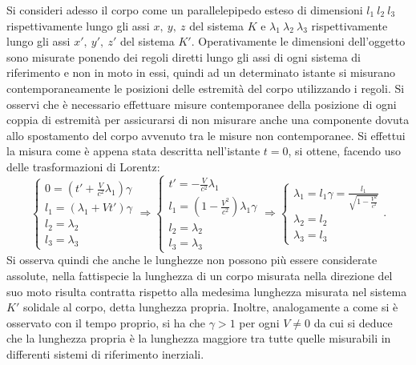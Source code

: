Si consideri adesso il corpo come un parallelepipedo esteso di dimensioni $l_1\ l_2\ l_3$ rispettivamente lungo gli assi $x,\ y,\ z$ del sistema $K$ e $\lambda_1\ \lambda_2\ \lambda_3$ rispettivamente lungo gli assi $x',\ y',\ z'$ del sistema $K'$. Operativamente le dimensioni dell'oggetto sono misurate ponendo dei regoli diretti lungo gli assi di ogni sistema di riferimento e non in moto in essi, quindi ad un determinato istante si misurano contemporaneamente le posizioni delle estremità del corpo utilizzando i regoli. Si osservi che è necessario effettuare misure contemporanee della posizione di ogni coppia di estremità per assicurarsi di non misurare anche una componente dovuta allo spostamento del corpo avvenuto tra le misure non contemporanee. Si effettui la misura come è appena stata descritta nell'istante $t=0$, si ottene, facendo uso delle trasformazioni di Lorentz: 
\begin{equation}
    \begin{cases}
        0=(t'+\frac{V}{c^2}\lambda_1)\gamma\\
        l_1=(\lambda_1+Vt')\gamma\\
        l_2=\lambda_2\\
        l_3=\lambda_3
    \end{cases}
    \Rightarrow
    \begin{cases}
        t'=-\frac{V}{c^2}\lambda_1\\
        l_1=(1-\frac{V^2}{c^2})\lambda_1\gamma\\
        l_2=\lambda_2\\
        l_3=\lambda_3
    \end{cases}
    \Rightarrow
    \begin{cases}
        \lambda_1=l_1\gamma=\frac{l_1}{\sqrt{1-\frac{V^2}{c^2}}}\\
        \lambda_2=l_2\\
        \lambda_3=l_3
    \end{cases}.
    \label{contrazioneLunghezze}
\end{equation}   
 Si osserva quindi che anche le lunghezze non possono più essere considerate assolute, nella fattispecie la lunghezza di un corpo misurata nella direzione del suo moto risulta contratta rispetto alla medesima lunghezza misurata nel sistema $K'$ solidale al corpo, detta lunghezza propria. Inoltre, analogamente a come si è osservato con il tempo proprio, si ha che $\gamma > 1$ per ogni $V\neq0$ da cui si deduce che la lunghezza propria è la lunghezza maggiore tra tutte quelle misurabili in differenti sistemi di riferimento inerziali.\\
 

